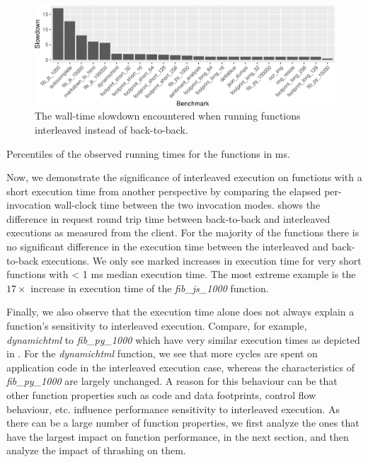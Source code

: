 \begin{figure}
  \centering
  \includegraphics[width=\textwidth]{figures/thrasher_speedups.pdf}
  \caption{\label{wosc:fig:slowdown} The wall-time slowdown encountered when running functions interleaved instead of back-to-back.}
\end{figure}

\begin{table}
  \caption{\label{wosc:tab:timings} Percentiles of the observed running times for the functions in ms.}
  \centering
  
\end{table}

Now, we demonstrate the significance of interleaved execution on functions with a short execution time from another perspective by comparing the elapsed per-invocation wall-clock time between the two invocation modes.   shows the difference in request round trip time between back-to-back and interleaved executions as measured from the client. For the majority of the functions there is no significant difference in the execution time between the interleaved and back-to-back executions. We only see marked increases in execution time for very short functions  with < 1 ms median execution time. The most extreme example is the $17\times$ increase in execution time of the \emph{fib\_js\_1000} function.

Finally, we also observe that the execution time alone does not always explain a function's sensitivity to interleaved execution. Compare, for example, \emph{dynamichtml} to \emph{fib\_py\_1000} which have very similar execution times as depicted in . For the \emph{dynamichtml} function, we see that more cycles are spent on application code in the interleaved execution case, whereas the characteristics of \emph{fib\_py\_1000} are largely unchanged. A reason for this behaviour can be that other function properties such as code and data footprints, control flow behaviour, etc. influence performance sensitivity to interleaved execution. As there can be a large number of function properties, we first analyze the ones that have the largest impact on function performance, in the next section, and then analyze the impact of thrashing on them.


